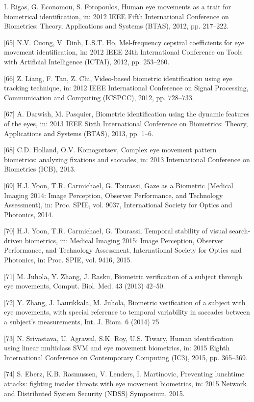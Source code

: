 \documentclass{article}
\begin{document}
\begin{raggedright}
[64] I. Rigas, G. Economou, S. Fotopoulos, Human eye movements as a trait for biometrical identification, in: 2012 IEEE Fifth International Conference on Biometrics: Theory, Applications and Systems (BTAS), 2012, pp. 217–222.

[65] N.V. Cuong, V. Dinh, L.S.T. Ho, Mel-frequency cepstral coefficients for eye movement identification, in: 2012 IEEE 24th International Conference on Tools with Artificial Intelligence (ICTAI), 2012, pp. 253–260.

[66] Z. Liang, F. Tan, Z. Chi, Video-based biometric identification using eye tracking technique, in: 2012 IEEE International Conference on Signal Processing, Communication and Computing (ICSPCC), 2012, pp. 728–733.

[67] A. Darwish, M. Pasquier, Biometric identification using the dynamic features of the eyes, in: 2013 IEEE Sixth International Conference on Biometrics: Theory, Applications and Systems (BTAS), 2013, pp. 1–6.

[68] C.D. Holland, O.V. Komogortsev, Complex eye movement pattern biometrics: analyzing fixations and saccades, in: 2013 International Conference on Biometrics (ICB), 2013.

[69] H.J. Yoon, T.R. Carmichael, G. Tourassi, Gaze as a Biometric (Medical Imaging 2014: Image Perception, Observer Performance, and Technology Assessment), in: Proc. SPIE, vol. 9037, International Society for Optics and Photonics, 2014.

[70] H.J. Yoon, T.R. Carmichael, G. Tourassi, Temporal stability of visual search-driven biometrics, in: Medical Imaging 2015: Image Perception, Observer Performance, and Technology Assessment, International Society for Optics and Photonics, in: Proc. SPIE, vol. 9416, 2015.

[71] M. Juhola, Y. Zhang, J. Rasku, Biometric verification of a subject through eye movements, Comput. Biol. Med. 43 (2013) 42–50.

[72] Y. Zhang, J. Laurikkala, M. Juhola, Biometric verification of a subject with eye movements, with special reference to temporal variability in saccades between a subject's measurements, Int. J. Biom. 6 (2014) 75

[73] N. Srivastava, U. Agrawal, S.K. Roy, U.S. Tiwary, Human identification using linear multiclass SVM and eye movement biometrics, in: 2015 Eighth International Conference on Contemporary Computing (IC3), 2015, pp. 365–369.

[74] S. Eberz, K.B. Rasmussen, V. Lenders, I. Martinovic, Preventing lunchtime attacks: fighting insider threats with eye movement biometrics, in: 2015 Network and Distributed System Security (NDSS) Symposium, 2015.


\end{raggedright}
\end{document}
